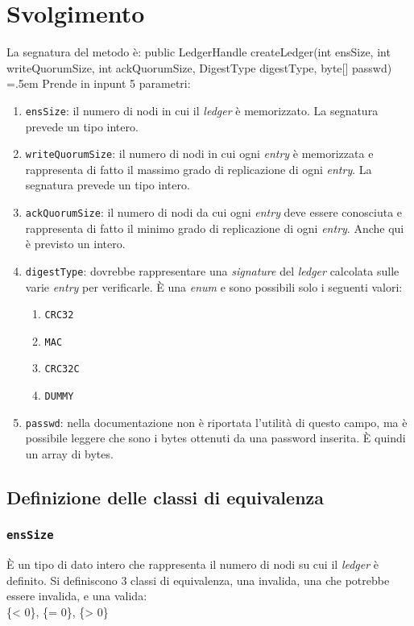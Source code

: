\documentclass[a4paper, 12pt]{article}
\newcommand{\key}[1]{\texttt{#1}}
\newenvironment{myverb}
 {\SaveVerbatim{cverb}}
 {\endSaveVerbatim
  \flushleft\fboxrule=0pt\fboxsep=.5em
  \colorbox{cverbbg}{%
    \makebox[\dimexpr\linewidth-2\fboxsep][l]{\BUseVerbatim{cverb}}%
  }
  \endflushleft
}
\begin{document}
\section{Svolgimento}
La segnatura del metodo è:
\begin{myverb}
public LedgerHandle createLedger(int ensSize, 
      int writeQuorumSize, 
      int ackQuorumSize, 
      DigestType digestType, 
      byte[] passwd)
\end{myverb}
Prende in inpunt 5 parametri:
\begin{enumerate}
\item \key{ensSize}: il numero di nodi in cui il \textit{ledger} è memorizzato. La segnatura prevede un tipo intero.

\item \key{writeQuorumSize}: il numero di nodi in cui ogni \textit{entry} è memorizzata e rappresenta di fatto il massimo grado di replicazione di ogni \textit{entry}. La segnatura prevede un tipo intero.

\item \key{ackQuorumSize}: il numero di nodi da cui ogni \textit{entry} deve essere conosciuta e rappresenta di fatto il minimo grado di replicazione di ogni \textit{entry}. Anche qui è previsto un intero.

\item \key{digestType}: dovrebbe rappresentare una \textit{signature} del \textit{ledger} calcolata sulle varie \textit{entry} per verificarle. È una \textit{enum} e sono possibili solo i seguenti valori:
	\begin{enumerate}
	\item \key{CRC32}
    \item \key{MAC}
 	\item \key{CRC32C}
    \item \key{DUMMY}
	\end{enumerate}

\item \key{passwd}: nella documentazione non è riportata l'utilità di questo campo, ma è possibile leggere che sono i bytes ottenuti da una password inserita. È quindi un array di bytes. 
\end{enumerate}

\subsection{Definizione delle classi di equivalenza}

\subsubsection{\key{ensSize}}
È un tipo di dato intero che rappresenta il numero di nodi su cui il \textit{ledger} è definito. Si definiscono 3 classi di equivalenza, una invalida, una che potrebbe essere invalida, e una valida:\\
\{< 0\}, \{= 0\}, \{> 0\}
\end{document}
